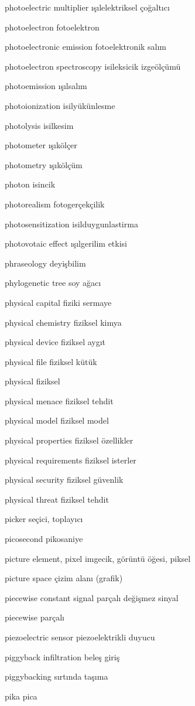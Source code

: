 \documentclass[12pt,fleqn]{article}\usepackage{../../common}
\begin{document}
photoelectric multiplier ışılelektriksel çoğaltıcı

photoelectron fotoelektron

photoelectronic emission fotoelektronik salım

photoelectron spectroscopy isileksicik izgeölçümü

photoemission ışılsalım

photoionization isilyükünlesme

photolysis isilkesim

photometer ışıkölçer

photometry ışıkölçüm

photon isincik

photorealism fotogerçekçilik

photosensitization isilduygunlastirma

photovotaic effect ışılgerilim etkisi

phraseology deyişbilim

phylogenetic tree soy ağacı

physical capital fiziki sermaye

physical chemistry fiziksel kimya

physical device fiziksel aygıt

physical file fiziksel kütük

physical fiziksel

physical menace fiziksel tehdit

physical model fiziksel model

physical properties fiziksel özellikler

physical requirements fiziksel isterler

physical security fiziksel güvenlik

physical threat fiziksel tehdit

picker seçici, toplayıcı

picosecond pikosaniye

picture element, pixel imgecik, görüntü öğesi, piksel

picture space çizim alanı (grafik)

piecewise constant signal parçalı değişmez sinyal

piecewise parçalı

piezoelectric sensor piezoelektrikli duyucu

piggyback infiltration beleş giriş

piggybacking sırtında taşıma

pika pica
\end{document}
